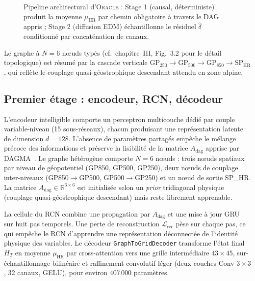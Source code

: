 \documentclass[14pt,a4paper,openany]{extreport}
\theoremstyle{definition}
\newcommand{\Oracle}{\textsc{Oracle}}
\newcommand{\HR}{\ensuremath{\text{HR}}}
\newcommand{\muHR}{\ensuremath{\mu_{\HR}}}
\newcommand{\Adag}{\ensuremath{A_{\mathrm{dag}}}}
\newcommand{\HT}{\ensuremath{H_T}}
\begin{document}
\begin{figure}[H]
{%
}
\caption{Pipeline architectural d'\Oracle{} : Stage 1 (causal, déterministe) produit la moyenne $\muHR$ par chemin obligatoire à travers le DAG appris ; Stage 2 (diffusion EDM) échantillonne le résiduel $\widehat\delta$ conditionné par concaténation de canaux.}
\label{fig:exp-architecture}
\end{figure}

Le graphe à $N=6$ n\oe uds typés (cf.~chapitre~III, Fig.~3.2 pour le détail topologique) est résumé par la cascade verticale GP$_{250}\!\to\!$GP$_{500}\!\to\!$GP$_{850}\!\to\!$SP$_{\HR}$, qui reflète le couplage quasi-géostrophique descendant attendu en zone alpine.

\subsection{Premier étage : encodeur, RCN, décodeur}
\label{ssec:exp-topo-stage1}

L'encodeur intelligible comporte un perceptron multicouche dédié par couple variable-niveau (15 sous-réseaux), chacun produisant une représentation latente de dimension $d = 128$. L'absence de paramètres partagés empêche le mélange précoce des informations et préserve la lisibilité de la matrice $\Adag$ apprise par DAGMA~\cite{bello_dagma_2022}. Le graphe hétérogène comporte $N = 6$ nœuds : trois nœuds spatiaux par niveau de géopotentiel (GP850, GP500, GP250), deux nœuds de couplage inter-niveaux (GP850$\rightarrow$GP500, GP500$\rightarrow$GP250) et un nœud de sortie SP\_HR. La matrice $\Adag \in \mathbb{R}^{6 \times 6}$ est initialisée selon un \emph{prior} tridiagonal physique (couplage quasi-géostrophique descendant) mais reste librement apprenable.

La cellule du RCN combine une propagation par $\Adag$ et une mise à jour GRU~\cite{cho_gru_2014} sur huit pas temporels. Une perte de reconstruction $\mathcal{L}_{\mathrm{rec}}$ pèse sur chaque pas, ce qui empêche le RCN d'apprendre une représentation déconnectée de l'identité physique des variables. Le décodeur \texttt{GraphToGridDecoder} transforme l'état final $\HT$ en moyenne $\muHR$ par cross-attention vers une grille intermédiaire $43 \times 45$, sur-échantillonnage bilinéaire et raffinement convolutif léger (deux couches Conv $3 \times 3$, 32 canaux, GELU), pour environ $407\,000$ paramètres.
\end{document}
